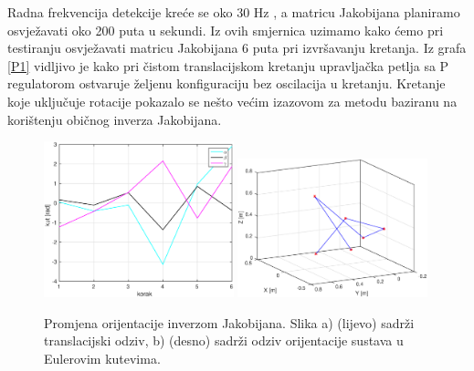 \documentclass[times, utf8, diplomski, numeric]{fer}
\begin{document}
Radna frekvencija detekcije kreće se oko 30 Hz , a matricu Jakobijana planiramo osvježavati oko 200 puta u sekundi.
Iz ovih smjernica uzimamo kako ćemo pri testiranju osvježavati matricu Jakobijana 6 puta pri izvršavanju kretanja.
Iz grafa \ref{P1} vidljivo je kako pri čistom translacijskom kretanju upravljačka petlja sa P regulatorom ostvaruje željenu konfiguraciju  bez oscilacija u kretanju.
Kretanje koje uključuje rotacije pokazalo se nešto većim izazovom za metodu baziranu na korištenju običnog inverza Jakobijana.
\begin{figure}[h!]
\centering
\includegraphics[width = 0.49\textwidth]{matlab_rot1}
\includegraphics[width = 0.49\textwidth]{matlab_rot1_xyz}
\caption{Promjena orijentacije inverzom Jakobijana.
Slika a) (lijevo) sadrži translacijski odziv, b) (desno) sadrži odziv orijentacije sustava u Eulerovim kutevima.} \label{rot1m}
\end{figure}
\end{document}
